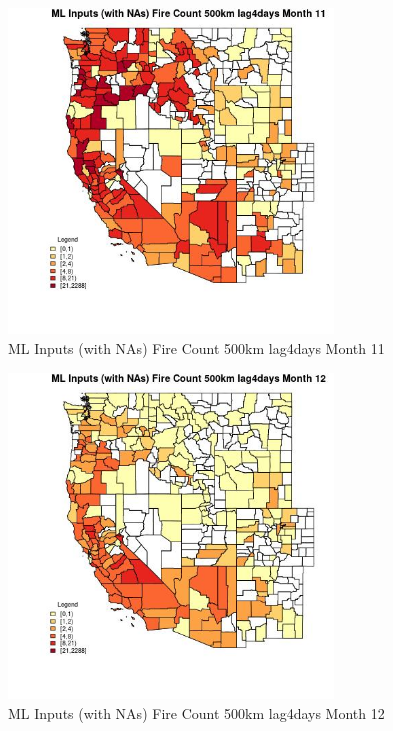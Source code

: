 \begin{figure} 
\centering  
\includegraphics[width=0.77\textwidth]{Code_Outputs/Report_ML_input_PM25_Step4_part_e_de_duplicated_aves_compiled_2019-05-21wNAs_CountyFire_Count_500km_lag4daysmedianMonth11.jpg} 
\caption{\label{fig:Report_ML_input_PM25_Step4_part_e_de_duplicated_aves_compiled_2019-05-21wNAsCountyFire_Count_500km_lag4daysmedianMonth11}ML Inputs (with NAs) Fire Count 500km lag4days Month 11} 
\end{figure} 
 

\begin{figure} 
\centering  
\includegraphics[width=0.77\textwidth]{Code_Outputs/Report_ML_input_PM25_Step4_part_e_de_duplicated_aves_compiled_2019-05-21wNAs_CountyFire_Count_500km_lag4daysmedianMonth12.jpg} 
\caption{\label{fig:Report_ML_input_PM25_Step4_part_e_de_duplicated_aves_compiled_2019-05-21wNAsCountyFire_Count_500km_lag4daysmedianMonth12}ML Inputs (with NAs) Fire Count 500km lag4days Month 12} 
\end{figure} 
 

